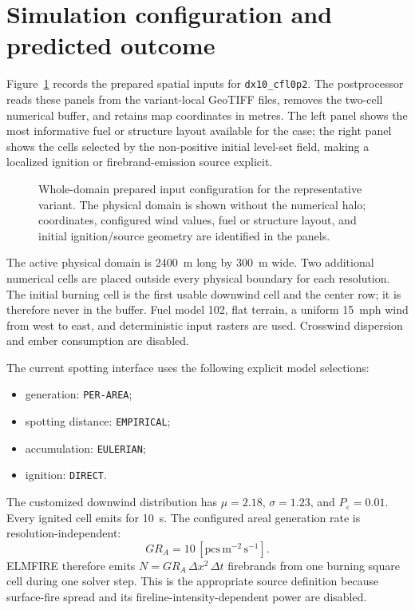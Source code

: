 \section{Simulation configuration and predicted outcome}

Figure~\ref{fig:input-configuration} records the prepared spatial inputs for \texttt{dx10\_cfl0p2}.
The postprocessor reads these panels from the variant-local GeoTIFF files, removes the
two-cell numerical buffer, and retains map coordinates in metres.  The left panel shows
the most informative fuel or structure layout available for the case; the right panel
shows the cells selected by the non-positive initial level-set field, making a localized
ignition or firebrand-emission source explicit.

\begin{figure}[H]
\centering
{}
\caption{Whole-domain prepared input configuration for the representative variant.  The
physical domain is shown without the numerical halo; coordinates, configured wind values,
fuel or structure layout, and initial ignition/source geometry are identified in the panels.}
\label{fig:input-configuration}
\end{figure}

The active physical domain is \SI{2400}{m} long by \SI{300}{m} wide.  Two
additional numerical cells are placed outside every physical boundary for
each resolution.  The initial burning cell is the first usable downwind cell
and the center row; it is therefore never in the buffer.  Fuel model 102,
flat terrain, a uniform \SI{15}{mph} wind from west to east, and deterministic
input rasters are used.  Crosswind dispersion and ember consumption are
disabled.

The current spotting interface uses the following explicit model selections:
\begin{itemize}
  \item generation: \texttt{PER-AREA};
  \item spotting distance: \texttt{EMPIRICAL};
  \item accumulation: \texttt{EULERIAN};
  \item ignition: \texttt{DIRECT}.
\end{itemize}
The customized downwind distribution has $\mu=2.18$, $\sigma=1.23$, and
$P_\varepsilon=0.01$.  Every ignited cell emits for \SI{10}{s}.  The configured areal generation rate is resolution-independent:
\begin{equation}
  GR_A=10\,[\mathrm{pcs\,m^{-2}\,s^{-1}}].
\end{equation}
ELMFIRE therefore emits \(N=GR_A\,\Delta x^2\,\Delta t\) firebrands from one burning square cell during one solver step. This is the appropriate source definition because surface-fire spread and its fireline-intensity-dependent power are disabled.

